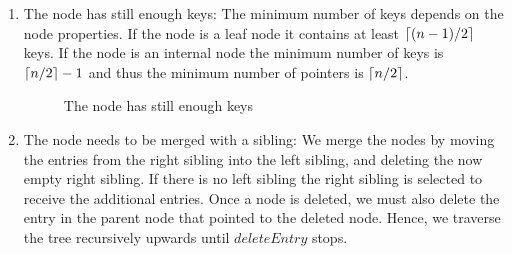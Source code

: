 \documentclass[abstracton,12pt]{scrreprt}
\DeclarePairedDelimiter\ceil{\lceil}{\rceil}
\begin{document}
\begin{enumerate}
	\item The node has still enough keys: The minimum number of keys depends on the node properties. If the node is a leaf node it contains at least $\ceil{(n-1)/2}$ keys. If the node is an internal node the minimum number of keys is $\ceil{n/2}-1$ and thus the minimum number of pointers is $\ceil{n/2}$. 
	\begin{figure}[ht!]
		\centering
		\vspace{2mm}
		\caption{The node has still enough keys}
		\label{fig:enoughkeys}
	\end{figure} 
		
	\item The node needs to be merged with a sibling: We merge the nodes by moving the entries from the right sibling into the left sibling, and deleting the now empty right sibling. If there is no left sibling the right sibling is selected to receive the additional entries. Once a node is deleted, we must also delete the entry in the parent node that pointed to the deleted node. Hence, we traverse the tree recursively upwards  until $deleteEntry$ stops.
	

\end{enumerate}
\end{document}
